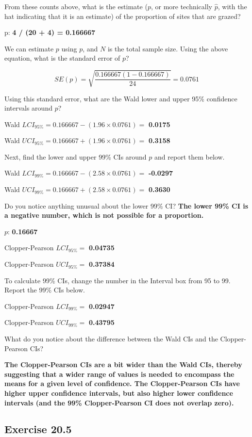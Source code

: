 \documentclass[
  openany]{krantz}
\begin{document}
From these counts above, what is the estimate (\(p\), or more technically \(\hat{p}\), with the hat indicating that it is an estimate) of the proportion of sites that are grazed?

p: \textbf{4 / (20 + 4) = 0.166667}

We can estimate \(p\) using \(p\), and \(N\) is the total sample size. Using the above equation, what is the standard error of \(p\)?

\[SE(p) = \sqrt{\frac{0.166667(1 - 0.166667)}{24}} = 0.0761\]

Using this standard error, what are the Wald lower and upper 95\% confidence intervals around \(p\)?

Wald \(LCI_{95\%} = 0.166667 - (1.96 \times 0.0761) =\) \textbf{0.0175}

Wald \(UCI_{95\%} = 0.166667 + (1.96 \times 0.0761) =\) \textbf{0.3158}

Next, find the lower and upper 99\% CIs around \(p\) and report them below.

Wald \(LCI_{99\%} = 0.166667 - (2.58 \times 0.0761) =\) \textbf{-0.0297}

Wald \(UCI_{99\%} = 0.166667 + (2.58 \times 0.0761) =\) \textbf{0.3630}

Do you notice anything unusual about the lower 99\% CI? \textbf{The lower 99\% CI is a negative number, which is not possible for a proportion.}

\(p\): \textbf{0.16667}

Clopper-Pearson \(LCI_{95\%} =\) \textbf{0.04735}

Clopper-Pearson \(UCI_{95\%} =\) \textbf{0.37384}

To calculate 99\% CIs, change the number in the Interval box from 95 to 99.
Report the 99\% CIs below.

Clopper-Pearson \(LCI_{99\%} =\) \textbf{0.02947}

Clopper-Pearson \(UCI_{99\%} =\) \textbf{0.43795}

What do you notice about the difference between the Wald CIs and the Clopper-Pearson CIs?

\textbf{The Clopper-Pearson CIs are a bit wider than the Wald CIs, thereby suggesting that a wider range of values is needed to encompass the means for a given level of confidence. The Clopper-Pearson CIs have higher upper confidence intervals, but also higher lower confidence intervals (and the 99\% Clopper-Pearson CI does not overlap zero).}

\hypertarget{exercise-20.5}{%
\subsection{Exercise 20.5}\label{exercise-20.5}}
\end{document}
